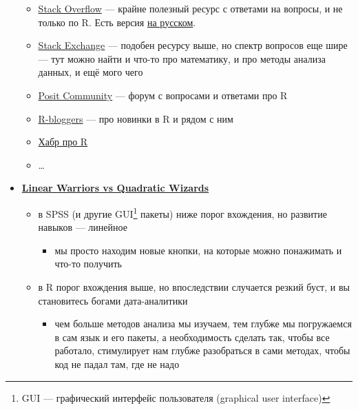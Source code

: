 \documentclass[
  letterpaper,
]{scrbook}
\providecommand{\tightlist}{%
  \setlength{\itemsep}{0pt}\setlength{\parskip}{0pt}}\usepackage{longtable,booktabs,array}
\theoremstyle{definition}
\theoremstyle{remark}
\begin{document}
\begin{itemize}
  \begin{itemize}
  \tightlist
  \item
    \href{https://stackoverflow.com/}{Stack Overflow} --- крайне
    полезный ресурс с ответами на вопросы, и не только по R. Есть версия
    \href{https://ru.stackoverflow.com/}{на русском}.
  \item
    \href{https://stackexchange.com/}{Stack Exchange} --- подобен
    ресурсу выше, но спектр вопросов еще шире --- тут можно найти и
    что-то про математику, и про методы анализа данных, и ещё мого чего
  \item
    \href{https://community.rstudio.com/}{Posit Community} --- форум с
    вопросами и ответами про R
  \item
    \href{https://www.r-bloggers.com/}{R-bloggers} --- про новинки в R и
    рядом с ним
  \item
    \href{https://habr.com/ru/hub/r/}{Хабр про R}
  \item
    \ldots{}
  \end{itemize}
\item
  \href{https://1d4chan.org/wiki/Linear_Warriors,_Quadratic_Wizards}{\textbf{Linear
  Warriors vs Quadratic Wizards}}

  \begin{itemize}
  \tightlist
  \item
    в SPSS (и другие GUI\footnote{GUI --- графический интерфейс
      пользователя (graphical user interface)} пакеты) ниже порог
    вхождения, но развитие навыков --- линейное

    \begin{itemize}
    \tightlist
    \item
      мы просто находим новые кнопки, на которые можно понажимать и
      что-то получить
    \end{itemize}
  \item
    в R порог вхождения выше, но впоследствии случается резкий буст, и
    вы становитесь богами дата-аналитики

    \begin{itemize}
    \tightlist
    \item
      чем больше методов анализа мы изучаем, тем глубже мы погружаемся в
      сам язык и его пакеты, а необходимость сделать так, чтобы все
      работало, стимулирует нам глубже разобраться в сами методах, чтобы
      код не падал там, где не надо
    \end{itemize}
  \end{itemize}
\end{itemize}
\end{document}
